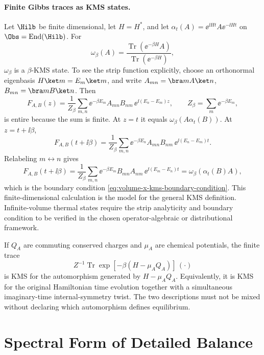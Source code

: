 \paragraph{Finite Gibbs traces as KMS states.}
Let \(\Hilb\) be finite dimensional, let \(H=H^\ast\), and let
\(\alpha_t(A)=\ee^{\ii Ht}A\ee^{-\ii Ht}\) on
\(\Obs=\operatorname{End}(\Hilb)\).  For
\begin{equation}
  \omega_\beta(A)
  =
  \frac{\operatorname{Tr}(\ee^{-\beta H}A)}
       {\operatorname{Tr}(\ee^{-\beta H})},
  \label{eq:finite-gibbs-state}
\end{equation}
\(\omega_\beta\) is a \(\beta\)-KMS state.  To see the strip function
explicitly, choose an orthonormal eigenbasis \(H\ket m=E_m\ket m\), and write
\(A_{mn}=\bra mA\ket n\), \(B_{mn}=\bra mB\ket n\).  Then
\begin{equation}
  F_{A,B}(z)
  =
  \frac{1}{Z_\beta}
  \sum_{m,n}
  \ee^{-\beta E_m}
  A_{mn}B_{nm}\,
  \ee^{\ii(E_n-E_m)z},
  \qquad
  Z_\beta=\sum_m\ee^{-\beta E_m},
  \label{eq:finite-kms-strip-function}
\end{equation}
is entire because the sum is finite.  At \(z=t\) it equals
\(\omega_\beta(A\alpha_t(B))\).  At \(z=t+\ii\beta\),
\[
  F_{A,B}(t+\ii\beta)
  =
  \frac{1}{Z_\beta}
  \sum_{m,n}
  \ee^{-\beta E_n}
  A_{mn}B_{nm}\,
  \ee^{\ii(E_n-E_m)t}.
\]
Relabeling \(m\leftrightarrow n\) gives
\[
  F_{A,B}(t+\ii\beta)
  =
  \frac{1}{Z_\beta}
  \sum_{m,n}
  \ee^{-\beta E_m}
  B_{mn}A_{nm}\,
  \ee^{\ii(E_m-E_n)t}
  =
  \omega_\beta(\alpha_t(B)A),
\]
which is the boundary condition
\eqref{eq:volume-x-kms-boundary-condition}.  This finite-dimensional
calculation is the model for the general KMS definition.  Infinite-volume
thermal states require the strip analyticity and boundary condition to be
verified in the chosen operator-algebraic or distributional framework.

\begin{remark}
\label{rem:kms-chemical-potential-evolution}
If \(Q_A\) are commuting conserved charges and \(\mu_A\) are chemical
potentials, the finite trace
\[
  Z^{-1}\operatorname{Tr}\exp[-\beta(H-\mu_AQ_A)]\,(\cdot)
\]
is KMS for the automorphism generated by \(H-\mu_AQ_A\).  Equivalently, it is
KMS for the original Hamiltonian time evolution together with a simultaneous
imaginary-time internal-symmetry twist.  The two descriptions must not be
mixed without declaring which automorphism defines equilibrium.
\end{remark}

\section{Spectral Form of Detailed Balance}

